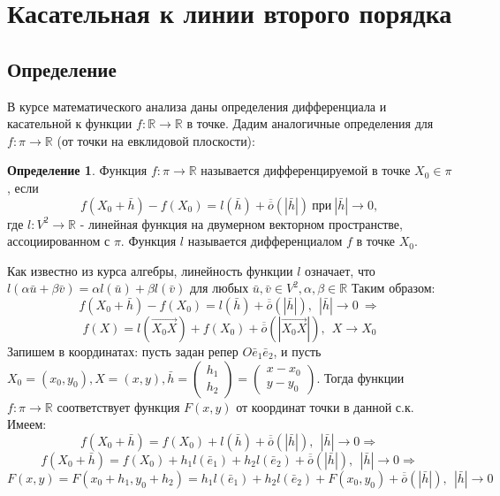 \documentclass[a4paper, 12pt]{article}
\theoremstyle{definition}
\newtheorem*{definition}{Определение}
\begin{document}
	\section{Касательная к линии второго порядка}
	\subsection{Определение}
	В курсе математического анализа даны определения дифференциала и касательной к функции $f: \mathbb{R} \rightarrow \mathbb{R}$ в точке. Дадим аналогичные определения для $f: \pi \rightarrow \mathbb{R}$ (от точки на евклидовой плоскости):
	\begin{definition}
		Функция $f: \pi \rightarrow \mathbb{R}$ называется дифференцируемой в точке $X_0 \in \pi$, если $$f(X_0 + \bar{h}) - f(X_0) = l(\bar{h}) + \overline{\overline{o}}(|\bar{h}|) \ \text{при} \ |\bar{h}| \rightarrow 0, $$
		где $l: V^2 \rightarrow \mathbb{R}$ - линейная функция на двумерном векторном пространстве, ассоциированном с $\pi$. Функция $l$ называется дифференциалом $f$ в точке $X_0$.
	\end{definition}
	Как известно из курса алгебры, линейность функции $l$ означает, что \\$l(\alpha\bar{u} + \beta\bar{v}) = \alpha l(\bar{u}) + \beta l(\bar{v})$ для любых $\bar{u}, \bar{v} \in V^2, \alpha, \beta \in \mathbb{R}$ 
	Таким образом: $$f(X_0 + \bar{h}) - f(X_0) = l(\bar{h}) + \overline{\overline{o}}(|\bar{h}|), \ \ |\bar{h}| \rightarrow 0 \ \Rightarrow$$ $$f(X) = l(\overrightarrow{X_0X}) + f(X_0) + \overline{\overline{o}}(|\overrightarrow{X_0X}|), \ \ X \rightarrow X_0$$
	Запишем в координатах: пусть задан репер $O\bar{e}_{1}\bar{e}_{2}$, и пусть $X_0 = (x_0, y_0), X = (x, y), \bar{h} = \begin{pmatrix} h_1 \\ h_2 \end{pmatrix} = \begin{pmatrix} x - x_0 \\ y- y_0 \end{pmatrix}$. Тогда функции $f: \pi \rightarrow \mathbb{R}$ соответствует функция $F(x, y)$ от координат точки в данной с.к. Имеем: $$f(X_0 + \bar{h}) = f(X_0) + l(\bar{h}) + \overline{\overline{o}}(|\bar{h}|), \ \ |\bar{h}| \rightarrow 0 \Rightarrow$$ $$f(X_0 + \bar{h}) = f(X_0) + h_1l(\bar{e}_1) + h_2l(\bar{e}_{2}) + \overline{\overline{o}}(|\bar{h}|), \ \ |\bar{h}| \rightarrow 0 \Rightarrow$$ $$F(x, y) = F(x_0 + h_1, y_0 + h_2) = h_1l(\bar{e}_{1}) + h_2l(\bar{e}_{2}) + F(x_0, y_0) + \overline{\overline{o}}(|\bar{h}|), \ \ |\bar{h}| \rightarrow 0$$
\end{document}
